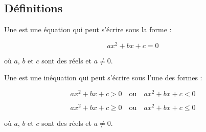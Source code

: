 \subsection{Définitions}
\begin{Definition}
\begin{MultiColonnes}{2}
    \tcbitem Une est une équation qui peut s'écrire sous la forme :

    $$ax^2+bx+c=0$$

    où $a$, $b$ et $c$ sont des réels et $a\neq 0$.

    \tcbitem Une est une inéquation qui peut s'écrire sous l'une des formes :

    $$ax^2+bx+c>0 \quad \text{ou} \quad ax^2+bx+c<0$$

    $$ax^2+bx+c\geq 0 \quad \text{ou} \quad ax^2+bx+c\leq 0$$

    où $a$, $b$ et $c$ sont des réels et $a\neq 0$.
\end{MultiColonnes}
\end{Definition}


